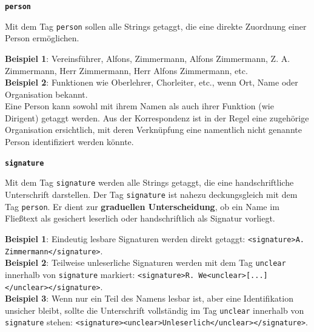 \documentclass[12pt, a4paper, ngerman, bidi=default]{article}
\begin{document}
    \begin{description}
    
    \item \textbf{\colorbox{person}{\texttt{person}}}
        
    Mit dem Tag \texttt{\colorbox{person}{person}} sollen alle Strings getaggt, die eine direkte Zuordnung einer Person ermöglichen.
    
    \noindent \textbf{ Beispiel 1}: Vereinsführer, Alfons, Zimmermann, Alfons Zimmermann, Z. A. Zimmermann, Herr Zimmermann, Herr Alfons Zimmermann, etc. \\
    \textbf{ Beispiel 2}: Funktionen wie Oberlehrer, Chorleiter, etc., wenn Ort, Name oder Organisation bekannt. \\
    
    Eine Person kann sowohl mit ihrem Namen als auch ihrer Funktion (wie Dirigent) getaggt werden.  
    Aus der Korrespondenz ist in der Regel eine zugehörige Organisation ersichtlich, mit deren Verknüpfung eine namentlich nicht genannte Person identifiziert werden könnte.
    
    \item \textbf{\colorbox{signature}{\texttt{signature}}}
        
    Mit dem Tag \texttt{\colorbox{signature}{signature}} werden alle Strings getaggt, die eine handschriftliche Unterschrift darstellen.  
    Der Tag \texttt{\colorbox{signature}{signature}} ist nahezu deckungsgleich mit dem Tag \texttt{\colorbox{person}{person}}.  
    Er dient zur \textbf{graduellen Unterscheidung}, ob ein Name im Fließtext als gesichert leserlich oder handschriftlich als Signatur vorliegt.  
    
    \noindent \textbf{ Beispiel 1}: Eindeutig lesbare Signaturen werden direkt getaggt:  
    \texttt{\textless signature\textgreater A. Zimmermann\textless /signature\textgreater}. \\  
    
    \textbf{ Beispiel 2}: Teilweise unleserliche Signaturen werden mit dem Tag \texttt{\colorbox{unclear}{unclear}} innerhalb von \texttt{\colorbox{signature}{signature}} markiert:  
    \texttt{\textless signature\textgreater R. We\textless unclear\textgreater [...]\textless /unclear\textgreater\textless /signature\textgreater}. \\  
    
    \textbf{ Beispiel 3}: Wenn nur ein Teil des Namens lesbar ist, aber eine Identifikation unsicher bleibt, sollte die Unterschrift vollständig im Tag \texttt{\colorbox{unclear}{unclear}} innerhalb von \texttt{\colorbox{signature}{signature}} stehen:  
    \texttt{\textless signature\textgreater \textless unclear\textgreater Unleserlich\textless /unclear\textgreater \textless /signature\textgreater}. \\  
    

\end{description}
\end{document}

